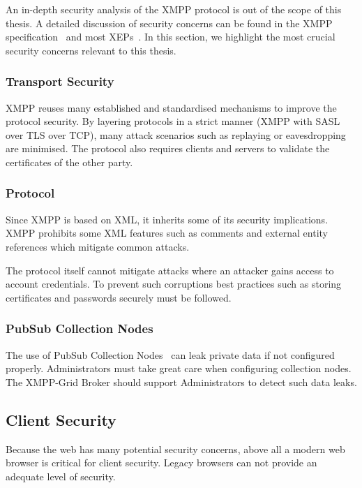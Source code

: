 An in-depth security analysis of the XMPP protocol is out of the scope of this thesis.
A detailed discussion of security concerns can be found in the XMPP specification~\cite{rfc6120} and most XEPs~\cite{xep-0060}\cite{xep-0248}.
In this section, we highlight the most crucial security concerns relevant to this thesis.

\subsubsection{Transport Security}

XMPP reuses many established and standardised mechanisms to improve the protocol security.
By layering protocols in a strict manner (XMPP with SASL over TLS over TCP), many attack scenarios such as replaying or eavesdropping are minimised.
The protocol also requires clients and servers to validate the certificates of the other party.~\cite{rfc7590}\cite{rfc6120}

\subsubsection{Protocol}

Since XMPP is based on XML, it inherits some of its security implications.
XMPP prohibits some XML features such as comments and external entity references which mitigate common attacks.~\cite{rfc6120}

The protocol itself cannot mitigate attacks where an attacker gains access to account credentials.
To prevent such corruptions best practices such as storing certificates and passwords securely must be followed.

\subsubsection{PubSub Collection Nodes}

The use of PubSub Collection Nodes~\cite{xep-0248} can leak private data if not configured properly.
Administrators must take great care when configuring collection nodes.
The XMPP-Grid Broker should support Administrators to detect such data leaks.

\subsection{Client Security}

Because the web has many potential security concerns, above all a modern web browser is critical for client security.
Legacy browsers can not provide an adequate level of security.~\cite{firefox-update-security}

